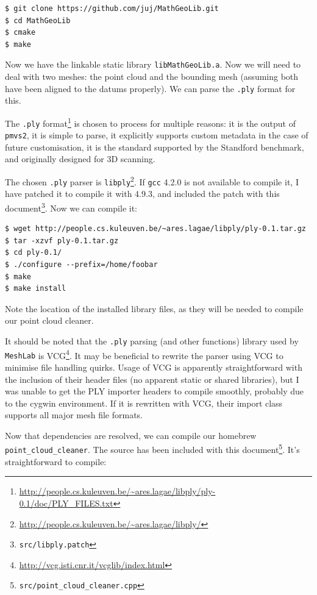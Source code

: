 \begin{lstlisting}
$ git clone https://github.com/juj/MathGeoLib.git
$ cd MathGeoLib
$ cmake
$ make
\end{lstlisting}

Now we have the linkable static library {\tt libMathGeoLib.a}. Now we will need to deal with two meshes: the point cloud and the bounding mesh (assuming both have been aligned to the datums properly). We can parse the {\tt .ply} format for this.

The {\tt .ply} format\footnote{\url{http://people.cs.kuleuven.be/~ares.lagae/libply/ply-0.1/doc/PLY_FILES.txt}} is chosen to process for multiple reasons: it is the output of {\tt pmvs2}, it is simple to parse, it explicitly supports custom metadata in the case of future customisation, it is the standard supported by the Standford benchmark, and originally designed for 3D scanning.

The chosen {\tt .ply} parser is {\tt libply}\footnote{\url{http://people.cs.kuleuven.be/~ares.lagae/libply/}}. If {\tt gcc} 4.2.0 is not available to compile it, I have patched it to compile it with 4.9.3, and included the patch with this document\footnote{{\tt src/libply.patch}}. Now we can compile it:

\begin{lstlisting}
$ wget http://people.cs.kuleuven.be/~ares.lagae/libply/ply-0.1.tar.gz
$ tar -xzvf ply-0.1.tar.gz
$ cd ply-0.1/
$ ./configure --prefix=/home/foobar
$ make
$ make install
\end{lstlisting}

Note the location of the installed library files, as they will be needed to compile our point cloud cleaner.

It should be noted that the {\tt .ply} parsing (and other functions) library used by {\tt MeshLab} is VCG\footnote{\url{http://vcg.isti.cnr.it/vcglib/index.html}}. It may be beneficial to rewrite the parser using VCG to minimise file handling quirks. Usage of VCG is apparently straightforward with the inclusion of their header files (no apparent static or shared libraries), but I was unable to get the PLY importer headers to compile smoothly, probably due to the cygwin environment. If it is rewritten with VCG, their import class supports all major mesh file formats.

Now that dependencies are resolved, we can compile our homebrew {\tt point\_cloud\_cleaner}. The source has been included with this document\footnote{{\tt src/point\_cloud\_cleaner.cpp}}. It's straightforward to compile:

